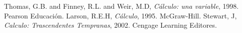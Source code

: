 \documentclass[12pt,oneside]{book}
\begin{document}
\frontmatter


\renewcommand{\contentsname}{Contenido}
\tableofcontents

\mainmatter 





\begin{thebibliography}{1}
 Thomas, G.B. and Finney, R.L. and Weir, M.D, \emph{Cálculo: una variable}, 1998. Pearson Educación. 
 Larson, R.E.H, \emph{Cálculo}, 1995. McGraw-Hill.
 Stewart, J, \emph{Calculo: Trascendentes Tempranas}, 2002. Cengage Learning Editores.
\end{thebibliography}
\end{document}
